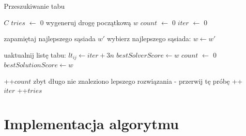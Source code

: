 \documentclass[11pt,a4paper,twoside]{article}
\begin{document}
\begin{algorithm}[ht]
\caption{Przeszukiwanie tabu}
\label{tabuSearchAlg}
\begin{algorithmic}%
\Require $C$
	\State $tries$ $\leftarrow$ 0
		\State wygeneruj drogę początkową $w$
		\State $count$ $\leftarrow$ 0
		\State $iter$ $\leftarrow$ 0
		
		\State zapamiętaj najlepszego sąsiada $w'$
		\EndIf
		\EndWhile
			\State wybierz najlepszego sąsiada: $w \leftarrow w'$ 
			
					
			\State uaktualnij listę tabu: $lt_{ij} \leftarrow iter + 3n$
				\State $bestSolverScore \leftarrow w$
				\State $count$ $\leftarrow$ 0
					\State $bestSolutionScore \leftarrow w$
					
    			\EndIf
    		
    		\Else
    			\State ++$count$
    		\EndIf
    			\State zbyt długo nie znaleziono lepszego rozwiązania - przerwij tę próbę
    		\EndIf
    	\State ++$iter$
		\EndWhile
		\State ++$tries$
	\EndWhile
\end{algorithmic}
\end{algorithm}



\section{Implementacja algorytmu}
\end{document}
